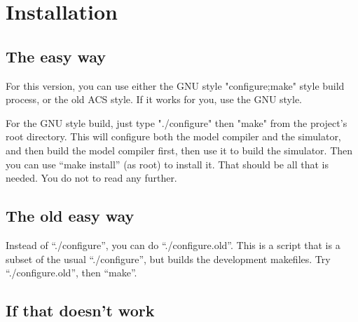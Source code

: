 %
%
%
%
\chapter{Installation}


\section{The easy way}

For this version, you can use either the GNU style "configure;make"
style build process, or the old ACS style.  If it works for you, use
the GNU style.

For the GNU style build, just type "./configure" then "make" from the
project's root directory.  This will configure both the model compiler
and the simulator, and then build the model compiler first, then use
it to build the simulator.  Then you can use ``make install'' (as
root) to install it.  That should be all that is needed.  You do not
to read any further.

\section{The old easy way}

Instead of ``./configure'', you can do ``./configure.old''.  This is a
script that is a subset of the usual ``./configure'', but builds the
development makefiles.  Try ``./configure.old'', then ``make''.

\section{If that doesn't work}

